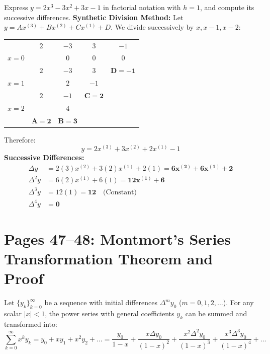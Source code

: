 \begin{examplebox}
Express $y = 2x^3 - 3x^2 + 3x - 1$ in factorial notation with $h = 1$, and compute its successive differences.
\textbf{Synthetic Division Method:}
Let $y = A x^{(3)} + B x^{(2)} + C x^{(1)} + D$.
We divide successively by $x, x-1, x-2$:
\begin{center}
\renewcommand{\arraystretch}{1.2}
\begin{tabular}{c|cccc}
& $2$ & $-3$ & $3$ & $-1$ \\
$x = 0$ & & $0$ & $0$ & $0$ \\
\hline
& $2$ & $-3$ & $3$ & $\mathbf{D = -1}$ \\
$x = 1$ & & $2$ & $-1$ & \\
\hline
& $2$ & $-1$ & $\mathbf{C = 2}$ & \\
$x = 2$ & & $4$ & & \\
\hline
& $\mathbf{A = 2}$ & $\mathbf{B = 3}$ & &
\end{tabular}
\end{center}
Therefore:
\begin{equation}
    \boxed{y = 2 x^{(3)} + 3 x^{(2)} + 2 x^{(1)} - 1}
\end{equation}
\textbf{Successive Differences:}
\begin{align}
    \Delta y &= 2(3) x^{(2)} + 3(2) x^{(1)} + 2(1) = \mathbf{6 x^{(2)} + 6 x^{(1)} + 2} \\
    \Delta^2 y &= 6(2) x^{(1)} + 6(1) = \mathbf{12 x^{(1)} + 6} \\
    \Delta^3 y &= 12(1) = \mathbf{12} \quad \text{(Constant)} \\
    \Delta^4 y &= \mathbf{0}
\end{align}
\end{examplebox}

\section{Pages 47--48: Montmort's Series Transformation Theorem and Proof}
\label{sec:montmort_theorem}

\begin{theorembox}
Let $\{y_k\}_{k=0}^\infty$ be a sequence with initial differences $\Delta^m y_0$ ($m = 0, 1, 2, \dots$). For any scalar $|x| < 1$, the power series with general coefficients $y_k$ can be summed and transformed into:
\begin{equation}
    \boxed{\sum_{k=0}^\infty x^k y_k = y_0 + x y_1 + x^2 y_2 + \dots = \frac{y_0}{1 - x} + \frac{x \Delta y_0}{(1 - x)^2} + \frac{x^2 \Delta^2 y_0}{(1 - x)^3} + \frac{x^3 \Delta^3 y_0}{(1 - x)^4} + \dots}
\end{equation}
\end{theorembox}

